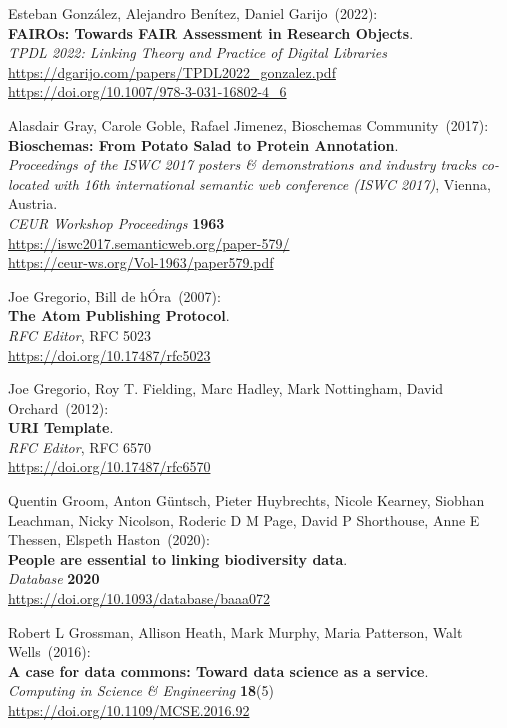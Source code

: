 \begin{thebibliography}{9}
Esteban González, Alejandro Benítez, Daniel Garijo~(2022): \\
\textbf{FAIROs: Towards FAIR Assessment in Research Objects}.\\
\emph{TPDL 2022: Linking Theory and Practice of Digital Libraries}\\
\url{https://dgarijo.com/papers/TPDL2022_gonzalez.pdf}\\
\url{https://doi.org/10.1007/978-3-031-16802-4_6}

Alasdair Gray, Carole Goble, Rafael Jimenez, Bioschemas Community~(2017): \\
\textbf{Bioschemas: From Potato Salad to Protein Annotation}.\\
\emph{Proceedings of the ISWC 2017 posters \& demonstrations and industry tracks co-located with 16th international semantic web conference (ISWC 2017)}, Vienna, Austria.\\
\emph{CEUR Workshop Proceedings} \textbf{1963} \\
\url{https://iswc2017.semanticweb.org/paper-579/} \\
\url{https://ceur-ws.org/Vol-1963/paper579.pdf}

Joe Gregorio, Bill de hÓra~(2007): \\
\textbf{The {Atom Publishing Protocol}}.\\
\emph{RFC Editor}, RFC 5023\\
\url{https://doi.org/10.17487/rfc5023}

Joe Gregorio, Roy T. Fielding, Marc Hadley, Mark Nottingham, David Orchard~(2012): \\
\textbf{{URI Template}}.\\
\emph{RFC Editor}, RFC 6570 \\
\url{https://doi.org/10.17487/rfc6570}

Quentin Groom, Anton Güntsch, Pieter Huybrechts, Nicole Kearney, Siobhan Leachman, Nicky Nicolson, Roderic D M Page, David P Shorthouse, Anne E Thessen, Elspeth Haston~(2020): \\
\textbf{People are essential to linking biodiversity data}.\\
\emph{Database} \textbf{2020}\\
\url{https://doi.org/10.1093/database/baaa072}

Robert L Grossman, Allison Heath, Mark Murphy, Maria Patterson, Walt Wells~(2016): \\
\textbf{A case for data commons: Toward data science as a service}.\\
\emph{Computing in Science \& Engineering} \textbf{18}(5) \\
\url{https://doi.org/10.1109/MCSE.2016.92}


\end{thebibliography}
